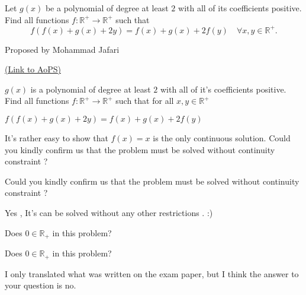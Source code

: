 \begin{problem}
	Let $g(x)$ be a polynomial of degree at least $2$ with all of its coefficients positive. Find all functions $f:\mathbb R^+ \longrightarrow \mathbb R^+$ such that
\[f(f(x)+g(x)+2y)=f(x)+g(x)+2f(y) \quad \forall x,y\in \mathbb R^+.\]

\begin{italicized}Proposed by Mohammad Jafari\end{italicized}
	\flushright \href{https://artofproblemsolving.com/community/c6h479267}{(Link to AoPS)}
\end{problem}



\begin{solution}
	\begin{tcolorbox}$g(x)$ is a polynomial of degree at least $2$ with all of it's coefficients positive. Find all functions $f:\mathbb R^+ \longrightarrow \mathbb R^+$ such that for all $x,y\in \mathbb R^+$

                                                                                  $f(f(x)+g(x)+2y)=f(x)+g(x)+2f(y)$\end{tcolorbox}
It's rather easy to show that $f(x)=x$ is the only continuous solution.
Could you kindly confirm us that the problem must be solved without continuity constraint ?
\end{solution}



\begin{solution}
	\begin{tcolorbox}
Could you kindly confirm us that the problem must be solved without continuity constraint ?\end{tcolorbox}
Yes , It's can be solved without any other restrictions . :)
\end{solution}



\begin{solution}
	Does $0\in \mathbb{R_+}$ in this problem?
\end{solution}



\begin{solution}
	\begin{tcolorbox}Does $0\in \mathbb{R_+}$ in this problem?\end{tcolorbox}

I only translated what was written on the exam paper, but I think the answer to your question is no.
\end{solution}



